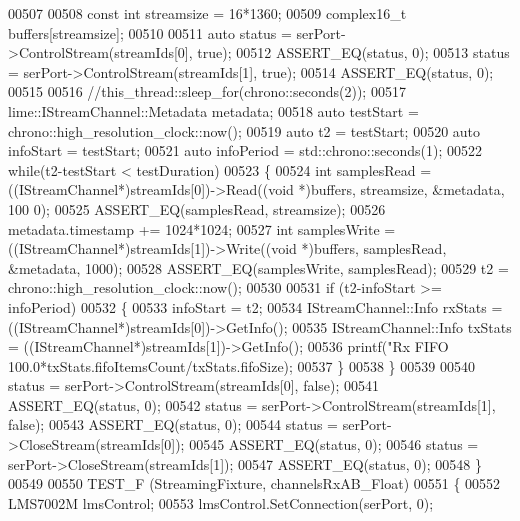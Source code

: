 \begin{DoxyCode}
{{{{{00507 
00508     \textcolor{keyword}{const} \textcolor{keywordtype}{int} streamsize = 16*1360;
00509     complex16_t buffers[streamsize];
00510 
00511     \textcolor{keyword}{auto} status = serPort->ControlStream(streamIds[0], \textcolor{keyword}{true});
00512     ASSERT\_EQ(status, 0);
00513     status = serPort->ControlStream(streamIds[1], \textcolor{keyword}{true});
00514     ASSERT\_EQ(status, 0);
00515 
00516     \textcolor{comment}{//this\_thread::sleep\_for(chrono::seconds(2));}
00517     lime::IStreamChannel::Metadata metadata;
00518     \textcolor{keyword}{auto} testStart = chrono::high\_resolution\_clock::now();
00519     \textcolor{keyword}{auto} t2 = testStart;
00520     \textcolor{keyword}{auto} infoStart = testStart;
00521     \textcolor{keyword}{auto} infoPeriod = std::chrono::seconds(1);
00522     \textcolor{keywordflow}{while}(t2-testStart < testDuration)
00523     \{
00524         \textcolor{keywordtype}{int} samplesRead = ((IStreamChannel*)streamIds[0])->Read((\textcolor{keywordtype}{void} *)buffers, streamsize, &metadata, 100
      0);
00525         ASSERT\_EQ(samplesRead, streamsize);
00526         metadata.timestamp += 1024*1024;
00527         \textcolor{keywordtype}{int} samplesWrite = ((IStreamChannel*)streamIds[1])->Write((\textcolor{keywordtype}{void} *)buffers, samplesRead, &metadata, 
      1000);
00528         ASSERT\_EQ(samplesWrite, samplesRead);
00529         t2 = chrono::high\_resolution\_clock::now();
00530 
00531         \textcolor{keywordflow}{if} (t2-infoStart >= infoPeriod)
00532         \{
00533             infoStart = t2;
00534             IStreamChannel::Info rxStats = ((IStreamChannel*)streamIds[0])->GetInfo();
00535             IStreamChannel::Info txStats = ((IStreamChannel*)streamIds[1])->GetInfo();
00536             printf(\textcolor{stringliteral}{"Rx FIFO %
       100.0*txStats.fifoItemsCount/txStats.fifoSize);
00537         \}
00538     \}
00539 
00540     status = serPort->ControlStream(streamIds[0], \textcolor{keyword}{false});
00541     ASSERT\_EQ(status, 0);
00542     status = serPort->ControlStream(streamIds[1], \textcolor{keyword}{false});
00543     ASSERT\_EQ(status, 0);
00544     status = serPort->CloseStream(streamIds[0]);
00545     ASSERT\_EQ(status, 0);
00546     status = serPort->CloseStream(streamIds[1]);
00547     ASSERT\_EQ(status, 0);
00548 \}
00549 
00550 TEST_F (StreamingFixture, channelsRxAB\_Float)
00551 \{
00552     LMS7002M lmsControl;
00553     lmsControl.SetConnection(serPort, 0);
}}}}}}
\end{DoxyCode}
